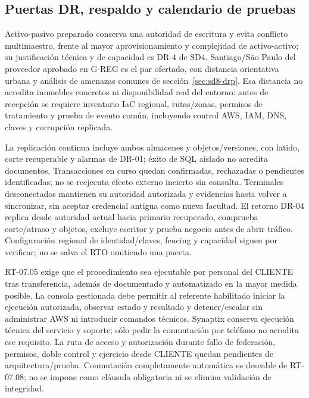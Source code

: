 \subsection{Puertas DR, respaldo y calendario de pruebas}\label{sec:sd8-bcp-puertas-p07}
Activo-pasivo preparado conserva una autoridad de escritura y evita conflicto multimaestro, frente al mayor aprovisionamiento y complejidad de activo-activo; su justificación técnica y de capacidad es DR-4 de SD4. Santiago/São Paulo del proveedor aprobado en G-REG es el par ofertado, con distancia orientativa urbana y análisis de amenazas comunes de sección~\ref{sec:sd8-drp}. Esa distancia no acredita inmuebles concretos ni disponibilidad real del entorno: antes de recepción se requiere inventario IaC regional, rutas/zonas, permisos de tratamiento y prueba de evento común, incluyendo control AWS, IAM, DNS, claves y corrupción replicada.

La replicación continua incluye ambos almacenes y objetos/versiones, con latido, corte recuperable y alarmas de DR-01; éxito de SQL aislado no acredita documentos. Transacciones en curso quedan confirmadas, rechazadas o pendientes identificadas; no se reejecuta efecto externo incierto sin consulta. Terminales desconectados mantienen su autoridad autorizada y evidencias hasta volver a sincronizar, sin aceptar credencial antigua como nueva facultad. El retorno DR-04 replica desde autoridad actual hacia primario recuperado, comprueba corte/atraso y objetos, excluye escritor y prueba negocio antes de abrir tráfico. Configuración regional de identidad/claves, fencing y capacidad siguen por verificar; no se salva el RTO omitiendo una puerta.

RT-07.05 exige que el procedimiento sea ejecutable por personal del CLIENTE tras transferencia, además de documentado y automatizado en la mayor medida posible. La consola gestionada debe permitir al referente habilitado iniciar la ejecución autorizada, observar estado y resultado y detener/escalar sin administrar AWS ni introducir comandos técnicos. Synaptix conserva ejecución técnica del servicio y soporte; sólo pedir la conmutación por teléfono no acredita ese requisito. La ruta de acceso y autorización durante fallo de federación, permisos, doble control y ejercicio desde CLIENTE quedan pendientes de arquitectura/prueba. Conmutación completamente automática es deseable de RT-07.08; no se impone como cláusula obligatoria ni se elimina validación de integridad. \parencite[RT-07.05/08; p.~17]{sd8-bt}


